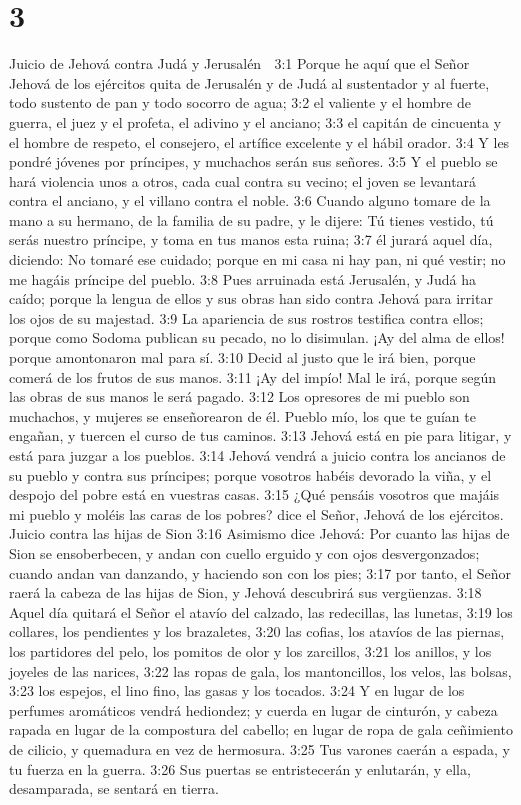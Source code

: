 \chapter{3}

Juicio de Jehová contra Judá y Jerusalén  

3:1 Porque he aquí que el Señor Jehová de los ejércitos quita de Jerusalén y de Judá al sustentador y al fuerte, todo sustento de pan y todo socorro de agua;  
3:2 el valiente y el hombre de guerra, el juez y el profeta, el adivino y el anciano;  
3:3 el capitán de cincuenta y el hombre de respeto, el consejero, el artífice excelente y el hábil orador.  
3:4 Y les pondré jóvenes por príncipes, y muchachos serán sus señores.  
3:5 Y el pueblo se hará violencia unos a otros, cada cual contra su vecino; el joven se levantará contra el anciano, y el villano contra el noble.  
3:6 Cuando alguno tomare de la mano a su hermano, de la familia de su padre, y le dijere: Tú tienes vestido, tú serás nuestro príncipe, y toma en tus manos esta ruina;  
3:7 él jurará aquel día, diciendo: No tomaré ese cuidado; porque en mi casa ni hay pan, ni qué vestir; no me hagáis príncipe del pueblo.  
3:8 Pues arruinada está Jerusalén, y Judá ha caído; porque la lengua de ellos y sus obras han sido contra Jehová para irritar los ojos de su majestad.  
3:9 La apariencia de sus rostros testifica contra ellos; porque como Sodoma publican su pecado, no lo disimulan. ¡Ay del alma de ellos! porque amontonaron mal para sí.  
3:10 Decid al justo que le irá bien, porque comerá de los frutos de sus manos.  
3:11 ¡Ay del impío! Mal le irá, porque según las obras de sus manos le será pagado.  
3:12 Los opresores de mi pueblo son muchachos, y mujeres se enseñorearon de él. Pueblo mío, los que te guían te engañan, y tuercen el curso de tus caminos.  
3:13 Jehová está en pie para litigar, y está para juzgar a los pueblos.  
3:14 Jehová vendrá a juicio contra los ancianos de su pueblo y contra sus príncipes; porque vosotros habéis devorado la viña, y el despojo del pobre está en vuestras casas.  
3:15 ¿Qué pensáis vosotros que majáis mi pueblo y moléis las caras de los pobres? dice el Señor, Jehová de los ejércitos.  
Juicio contra las hijas de Sion  
3:16 Asimismo dice Jehová: Por cuanto las hijas de Sion se ensoberbecen, y andan con cuello erguido y con ojos desvergonzados; cuando andan van danzando, y haciendo son con los pies;  
3:17 por tanto, el Señor raerá la cabeza de las hijas de Sion, y Jehová descubrirá sus vergüenzas.  
3:18 Aquel día quitará el Señor el atavío del calzado, las redecillas, las lunetas,  
3:19 los collares, los pendientes y los brazaletes,  
3:20 las cofias, los atavíos de las piernas, los partidores del pelo, los pomitos de olor y los zarcillos,  
3:21 los anillos, y los joyeles de las narices,  
3:22 las ropas de gala, los mantoncillos, los velos, las bolsas,  
3:23 los espejos, el lino fino, las gasas y los tocados.  
3:24 Y en lugar de los perfumes aromáticos vendrá hediondez; y cuerda en lugar de cinturón, y cabeza rapada en lugar de la compostura del cabello; en lugar de ropa de gala ceñimiento de cilicio, y quemadura en vez de hermosura.  
3:25 Tus varones caerán a espada, y tu fuerza en la guerra.  
3:26 Sus puertas se entristecerán y enlutarán, y ella, desamparada, se sentará en tierra.  

